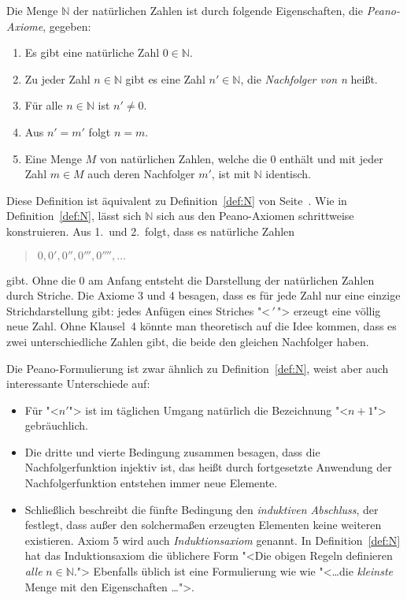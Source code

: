 \begin{definition} \label{def:peano}
Die Menge $\mathbb{N}$ der natürlichen Zahlen ist durch folgende
Eigenschaften, die \textit{Peano-Axiome}, gegeben:
\begin{enumerate}
\item Es gibt eine natürliche Zahl $0 \in \mathbb{N}$.
\item Zu jeder Zahl $n \in \mathbb{N}$ gibt es eine Zahl $n' \in \mathbb{N}$, die
      \emph{Nachfolger von n} heißt.
\item Für alle $n \in \mathbb{N}$ ist $n' \not = 0$.
\item Aus $n' = m'$ folgt $n=m$.
\item Eine Menge $M$ von natürlichen Zahlen, welche die $0$ enthält und mit jeder
      Zahl $m \in M$ auch deren Nachfolger $m'$, ist mit $\mathbb{N}$ identisch.
\end{enumerate}
\end{definition}
%
Diese Definition ist äquivalent zu Definition~\ref{def:N} von
Seite~\pageref{def:N}.  Wie in Definition~\ref{def:N}, lässt sich
$\mathbb{N}$ sich aus den Peano-Axiomen schrittweise konstruieren.
Aus 1.\ und 2.\ folgt, dass es natürliche Zahlen
\begin{quote}
  $0, 0', 0'', 0''', 0'''',\ldots$
\end{quote}
gibt.  Ohne die $0$ am Anfang entsteht die Darstellung der natürlichen Zahlen
durch Striche.  Die Axiome 3 und 4 besagen, dass es für jede Zahl nur
eine einzige Strichdarstellung 
gibt: jedes Anfügen eines Striches "<$\,'\,$"> erzeugt eine
völlig neue Zahl.  Ohne Klausel~4 könnte man theoretisch auf die Idee
kommen, dass es zwei unterschiedliche Zahlen gibt, die beide den
gleichen Nachfolger haben.

Die Peano-Formulierung ist zwar ähnlich zu Definition~\ref{def:N},
weist aber auch interessante Unterschiede auf:
%
\begin{itemize}
\item Für "<$n'$"> ist im täglichen Umgang natürlich die Bezeichnung
  "<$n+1$"> gebräuchlich.
\item Die dritte und vierte Bedingung zusammen besagen, dass die
  Nachfolgerfunktion injektiv ist, das heißt durch fortgesetzte Anwendung
  der Nachfolgerfunktion entstehen immer neue Elemente.
\item Schließlich beschreibt die fünfte Bedingung den
  \textit{induktiven Abschluss}, der
  festlegt, dass außer den solchermaßen erzeugten Elementen keine
  weiteren existieren.  Axiom 5 wird auch \emph{Induktionsaxiom}
   genannt.  In Definition~\ref{def:N} hat das
  Induktionsaxiom die üblichere Form "<Die obigen Regeln definieren
  \emph{alle} $n\in\mathbb{N}$.">  Ebenfalls üblich ist eine
  Formulierung wie wie "<\ldots die \emph{kleinste} Menge
  mit den Eigenschaften \ldots">.
\end{itemize}
%


